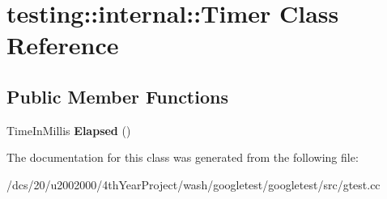 \hypertarget{classtesting_1_1internal_1_1Timer}{}\section{testing\+:\+:internal\+:\+:Timer Class Reference}
\label{classtesting_1_1internal_1_1Timer}
\subsection*{Public Member Functions}
\begin{DoxyCompactItemize}
\item 
\mbox{\label{classtesting_1_1internal_1_1Timer_a790226a241b81323a9ca7fc7b9452bf3}} 
Time\+In\+Millis {\bfseries Elapsed} ()
\end{DoxyCompactItemize}


The documentation for this class was generated from the following file\+:\begin{DoxyCompactItemize}
\item 
/dcs/20/u2002000/4th\+Year\+Project/wash/googletest/googletest/src/gtest.\+cc\end{DoxyCompactItemize}
